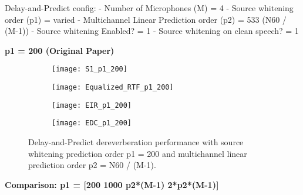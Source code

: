 Delay-and-Predict config:
- Number of Microphones (M) = 4
- Source whitening order (p1) = varied
- Multichannel Linear Prediction order (p2) = 533 (N60 / (M-1))
- Source whitening Enabled? = 1
- Source whitening on clean speech? = 1

\textbf{p1 = 200 (Original Paper)}

\begin{figure}[H]
	\centering
	\begin{subfigure}[b]{0.49\textwidth}
		\centering
		\texttt{[image: S1\_p1\_200]}
	\end{subfigure}
	\hfill
	\begin{subfigure}[b]{0.49\textwidth}
		\centering
		\texttt{[image: Equalized\_RTF\_p1\_200]}
	\end{subfigure}
	\hfill
	\begin{subfigure}[b]{0.49\textwidth}
		\centering
		\texttt{[image: EIR\_p1\_200]}
	\end{subfigure}
	\hfill
	\begin{subfigure}[b]{0.49\textwidth}
		\centering
		\texttt{[image: EDC\_p1\_200]}
	\end{subfigure}
	\hfill
	\caption{Delay-and-Predict dereverberation performance with source whitening prediction order p1 = 200 and multichannel linear prediction order p2 = N60 / (M-1).}
	\label{fig:params_p1_200}
\end{figure}

\textbf{Comparison: p1 = [200  1000  p2*(M-1)  2*p2*(M-1)]}

